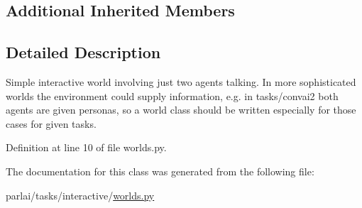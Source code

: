 \subsection*{Additional Inherited Members}


\subsection{Detailed Description}
\begin{DoxyVerb}Simple interactive world involving just two agents talking.
In more sophisticated worlds the environment could supply information,
e.g. in tasks/convai2 both agents are given personas, so a world
class should be written especially for those cases for given tasks.
\end{DoxyVerb}
 

Definition at line 10 of file worlds.\+py.



The documentation for this class was generated from the following file\+:\begin{DoxyCompactItemize}
\item 
parlai/tasks/interactive/\hyperlink{parlai_2tasks_2interactive_2worlds_8py}{worlds.\+py}\end{DoxyCompactItemize}
